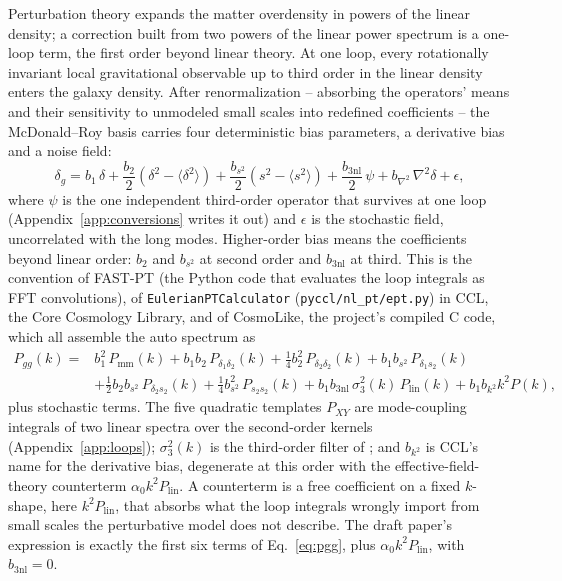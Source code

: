 \documentclass[11pt]{article}
\newcommand{\bone}{b_1}            %
\newcommand{\btwo}{b_2}            %
\newcommand{\bs}{b_{s^2}}          %
\newcommand{\bthree}{b_{3\mathrm{nl}}} %
\newcommand{\plin}{P_{\mathrm{lin}}}
\newcommand{\pnl}{P_{\mathrm{mm}}}
\begin{document}
Perturbation theory expands the matter overdensity in powers of the
linear density; a correction built from two powers of the linear power
spectrum is a one-loop term, the first order beyond linear theory.
At one loop, every rotationally invariant local gravitational
observable up to third order in the linear density enters the galaxy
density.  After renormalization -- absorbing the operators' means and
their sensitivity to unmodeled small scales into redefined
coefficients -- the McDonald--Roy basis
\cite{McDonaldRoy2009,Saito2014} carries four deterministic bias
parameters, a derivative bias and a noise field:
\begin{equation}
\delta_g = \bone\,\delta
 + \frac{\btwo}{2}\left(\delta^2 - \langle\delta^2\rangle\right)
 + \frac{\bs}{2}\left(s^2 - \langle s^2\rangle\right)
 + \frac{\bthree}{2}\,\psi
 + b_{\nabla^2}\,\nabla^2\delta + \epsilon ,
\label{eq:basis}
\end{equation}
where $\psi$ is the one independent third-order operator that survives
at one loop (Appendix~\ref{app:conversions} writes it out) and
$\epsilon$ is the stochastic field, uncorrelated with the long modes.
Higher-order bias means the coefficients beyond linear order: $\btwo$
and $\bs$ at second order and $\bthree$ at third.  This is the
convention of FAST-PT (the Python code that evaluates the loop
integrals as FFT convolutions), of \texttt{EulerianPTCalculator}
(\texttt{pyccl/nl\_pt/ept.py}) in CCL, the Core Cosmology Library, and
of CosmoLike, the project's compiled C code, which all assemble the
auto spectrum as
\begin{align}
P_{gg}(k) ={}& \bone^2\,\pnl(k)
 + \bone\btwo\,P_{\delta_1\delta_2}(k)
 + \tfrac{1}{4}\btwo^2\,P_{\delta_2\delta_2}(k)
 + \bone\bs\,P_{\delta_1 s_2}(k) \nonumber\\
&+ \tfrac{1}{2}\btwo\bs\,P_{\delta_2 s_2}(k)
 + \tfrac{1}{4}\bs^2\,P_{s_2 s_2}(k)
 + \bone\bthree\,\sigma_3^2(k)\,\plin(k)
 + \bone b_{k^2} k^2 P(k) ,
\label{eq:pgg}
\end{align}
plus stochastic terms.  The five quadratic templates $P_{XY}$ are
mode-coupling integrals of two linear spectra over the second-order
kernels (Appendix~\ref{app:loops}); $\sigma_3^2(k)$ is the third-order
filter of \cite{McDonaldRoy2009,Saito2014}; and $b_{k^2}$ is CCL's name
for the derivative bias, degenerate at this order with the
effective-field-theory counterterm $\alpha_0 k^2\plin$.  A counterterm
is a free coefficient on a fixed $k$-shape, here $k^2\plin$, that
absorbs what the loop integrals wrongly import from small scales the
perturbative model does not describe.  The draft
paper's expression is exactly the first six terms of
Eq.~\eqref{eq:pgg}, plus $\alpha_0 k^2\plin$, with $\bthree = 0$.
\end{document}
